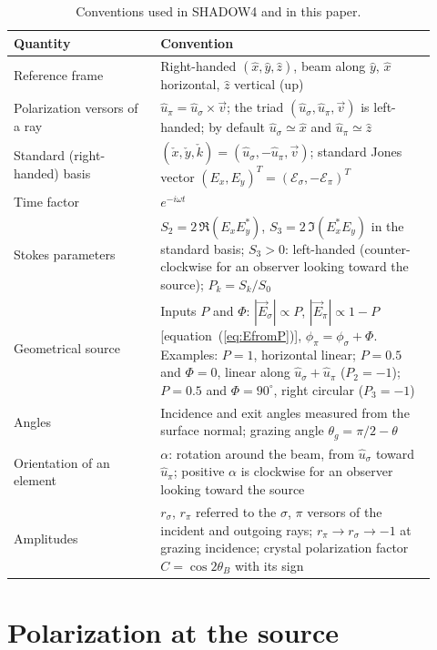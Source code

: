 \documentclass{iucr}
\begin{document}
\begin{table}
\caption{Conventions used in SHADOW4 and in this paper.}
\label{tab:conventions}
\begin{tabular}{p{0.32\linewidth}p{0.6\linewidth}}
\hline
Quantity & Convention \\
\hline
Reference frame & Right-handed $(\hat{x},\hat{y},\hat{z})$, beam along $\hat{y}$, $\hat{x}$ horizontal, $\hat{z}$ vertical (up) \\
Polarization versors of a ray & $\hat{u}_\pi=\hat{u}_\sigma\times\vec{v}$; the triad $(\hat{u}_\sigma,\hat{u}_\pi,\vec{v})$ is left-handed; by default $\hat{u}_\sigma\simeq\hat{x}$ and $\hat{u}_\pi\simeq\hat{z}$ \\
Standard (right-handed) basis & $(\check{x},\check{y},\check{k})=(\hat{u}_\sigma,-\hat{u}_\pi,\vec{v})$; standard Jones vector $(E_x,E_y)^T=(\mathcal{E}_\sigma,-\mathcal{E}_\pi)^T$ \\
Time factor & $e^{-i\omega t}$ \\
Stokes parameters & $S_2=2\,\Re(E_xE_y^*)$, $S_3=2\,\Im(E_x^*E_y)$ in the standard basis; $S_3>0$: left-handed (counter-clockwise for an observer looking toward the source); $P_k=S_k/S_0$ \\
Geometrical source & Inputs $P$ and $\Phi$: $|\vec{E}_\sigma|\propto P$, $|\vec{E}_\pi|\propto 1-P$ [equation~(\ref{eq:EfromP})], $\phi_\pi=\phi_\sigma+\Phi$. Examples: $P=1$, horizontal linear; $P=0.5$ and $\Phi=0$, linear along $\hat{u}_\sigma+\hat{u}_\pi$ ($P_2=-1$); $P=0.5$ and $\Phi=90^\circ$, right circular ($P_3=-1$) \\
Angles & Incidence and exit angles measured from the surface normal; grazing angle $\theta_g=\pi/2-\theta$ \\
Orientation of an element & $\alpha$: rotation around the beam, from $\hat{u}_\sigma$ toward $\hat{u}_\pi$; positive $\alpha$ is clockwise for an observer looking toward the source \\
Amplitudes & $r_\sigma$, $r_\pi$ referred to the $\sigma$, $\pi$ versors of the incident and outgoing rays; $r_\pi\rightarrow r_\sigma\rightarrow-1$ at grazing incidence; crystal polarization factor $C=\cos2\theta_B$ with its sign \\
\hline
\end{tabular}
\end{table}


\section{Polarization at the source}
\label{sec:source}
\end{document}
